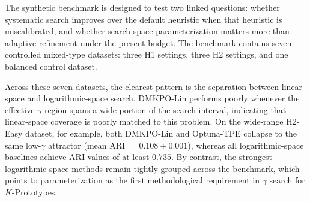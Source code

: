 \documentclass[10pt,lineno]{wlpeerj}
\begin{document}
The synthetic benchmark is designed to test two linked questions: whether systematic search improves over the default heuristic when that heuristic is miscalibrated, and whether search-space parameterization matters more than adaptive refinement under the present budget. The benchmark contains seven controlled mixed-type datasets: three H1 settings, three H2 settings, and one balanced control dataset.

Across these seven datasets, the clearest pattern is the separation between linear-space and logarithmic-space search. DMKPO-Lin performs poorly whenever the effective $\gamma$ region spans a wide portion of the search interval, indicating that linear-space coverage is poorly matched to this problem. On the wide-range H2-Easy dataset, for example, both DMKPO-Lin and Optuna-TPE collapse to the same low-$\gamma$ attractor (mean ARI $= 0.108 \pm 0.001$), whereas all logarithmic-space baselines achieve ARI values of at least $0.735$. By contrast, the strongest logarithmic-space methods remain tightly grouped across the benchmark, which points to parameterization as the first methodological requirement in $\gamma$ search for $K$-Prototypes.

\begin{table}[t]
\centering
\caption{Synthetic benchmark: mean ARI $\pm$ standard deviation over 30 runs. Search methods use 15 evaluations per run; Def.-KP is the no-search baseline. Best result per row is in bold; $\ddag$ marks the shared low-$\gamma$ attractor on H2-Easy.}
\label{tab:main_results}
\scriptsize
{}
\end{table}
\end{document}
